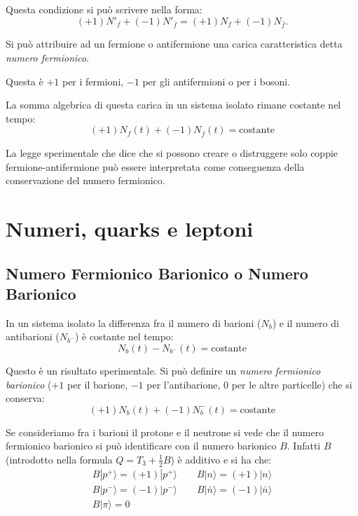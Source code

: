 Questa condizione si può scrivere nella forma:
\begin{equation*}
 (+1)N'_f + (-1)N'_{\bar{f}} = (+1)N_f + (-1)N_{\bar{f}}.
\end{equation*}


Si può attribuire ad un fermione o antifermione una carica caratteristica detta \emph{numero fermionico}.

Questa è $+1$ per i fermioni, $-1$ per gli antifermioni o per i bosoni.

La somma algebrica di questa carica in un sistema isolato rimane costante nel tempo:
\begin{equation*}
 (+1)N_f(t) + (-1)N_{\bar{f}}(t) = \text{costante}
\end{equation*}

La legge sperimentale che dice che si possono creare o distruggere solo coppie fermione-antifermione può essere interpretata
come conseguenza della conservazione del numero fermionico.
\chapter{Numeri, quarks e leptoni}
\section{Numero Fermionico Barionico o Numero Barionico}
In un sistema isolato la differenza fra il numero di barioni ($N_b$) e il numero di antibarioni ($N_{b^-}$) è costante nel tempo:
\[
N_b(t)-N_{b^-}(t)=\text{costante}
\]

Questo è un risultato sperimentale. Si può definire un \textit{numero fermionico barionico} ($+1$ per il barione,
$-1$ per l'antibarione, $0$ per le altre particelle) che si conserva:
\begin{equation}
(+1)N_b(t)+(-1)N_b^-(t)=\text{costante}
\end{equation}

Se consideriamo fra i barioni il protone e il neutrone si vede che il numero fermionico barionico si può
identificare con il numero barionico $B$. Infatti $B$ (introdotto nella formula $Q=T_3+\frac{1}{2}B$) è additivo e
si ha che:
\begin{gather}
B|p^+\rangle =(+1)|p^+\rangle\qquad B|n\rangle =(+1)|n\rangle\\
B|p^-\rangle =(-1)|p^-\rangle\qquad B|\bar{n}\rangle =(-1)|\bar{n}\rangle\\
B|\pi\rangle =0
\end{gather}

